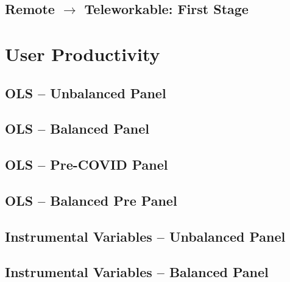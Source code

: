 \documentclass{article}
\newcommand{\cleanedresultsdir}{../../results/cleaned}
\begin{document}
\subsection{Remote $\rightarrow$ Teleworkable: First Stage}



\clearpage
\section{User Productivity}
\label{sec:user_productivity}

\subsection{OLS -- Unbalanced Panel}


\subsection{OLS -- Balanced Panel}


\subsection{OLS -- Pre-COVID Panel}

\subsection{OLS -- Balanced Pre Panel}


\subsection{Instrumental Variables -- Unbalanced Panel}


\subsection{Instrumental Variables -- Balanced Panel}

\end{document}

